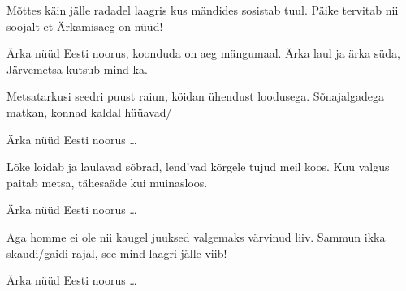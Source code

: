 M\~ottes k\"ain j\"alle radadel laagris
kus m\"andides sosistab tuul. 
P\"aike tervitab nii soojalt
et \"Arkamisaeg on n\"u\"ud!

\"Arka n\"u\"ud Eesti noorus,
koonduda on aeg m\"angumaal.
\"Arka laul ja \"arka s\"uda,
J\"arvemetsa kutsub mind ka.

Metsatarkusi seedri puust raiun,
k\"oidan \"uhendust loodusega.
S\~onajalgadega matkan,
konnad kaldal h\"u\"uavad/

\"Arka n\"u\"ud Eesti noorus \ldots

L\~oke loidab ja laulavad s\~obrad,
lend'vad k\~orgele tujud meil koos.
Kuu valgus paitab metsa,
t\"ahesa\"ade kui muinasloos.

\"Arka n\"u\"ud Eesti noorus \ldots

Aga homme ei ole nii kaugel
juuksed valgemaks v\"arvinud liiv.
Sammun ikka skaudi/gaidi rajal,
see mind laagri j\"alle viib!

\"Arka n\"u\"ud Eesti noorus \ldots
